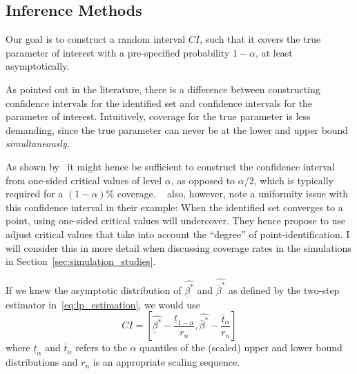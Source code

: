 \documentclass[12pt,a4paper,english]{article} %
\numberwithin{equation}{section}
\theoremstyle{definition}
\theoremstyle{remark}
\theoremstyle{plain}
\begin{document}
\subsection{Inference Methods}\label{sec:inference_methods}
Our goal is to construct a random interval $CI$, such that it covers the true parameter of interest with a pre-specified probability $1-\alpha$, at least asymptotically.

As pointed out in the literature, there is a difference between constructing confidence intervals for the identified set and confidence intervals for the parameter of interest.
Intuitively, coverage for the true parameter is less demanding, since the true parameter can never be at the lower and upper bound \textit{simultaneously}.

As shown by~\cite{imbens2004confidence} it might hence be sufficient to construct the confidence interval from one-sided critical values of level $\alpha$, as opposed to $\alpha/2$, which is typically required for a $(1-\alpha)\%$ coverage.
~\cite{imbens2004confidence} also, however, note a uniformity issue with this confidence interval in their example: When the identified set converges to a point, using one-sided critical values will undercover.
They hence propose to use adjust critical values that take into account the ``degree'' of point-identification.
I will consider this in more detail when discussing coverage rates in the simulations in Section~\ref{sec:simulation_studies}.


If we knew the asymptotic distribution of $\hat{\underline{\beta}^*}$ and $\hat{\overline{\beta}^*}$ as defined by the two-step estimator in~\ref{eq:lp_estimation}, we would use
\begin{equation*}
  CI = \left[\hat{\underline{\beta}^*} - \frac{\underline{t}_{1-\alpha}}{r_n}, \hat{\overline{\beta}^*} - \frac{\overline{t}_{\alpha}}{r_n}\right]
\end{equation*}
where $\underline{t}_\alpha$ and $\overline{t}_\alpha$ refers to the $\alpha$ quantiles of the (scaled) upper and lower bound distributions and $r_n$ is an appropriate scaling sequence.
\end{document}
